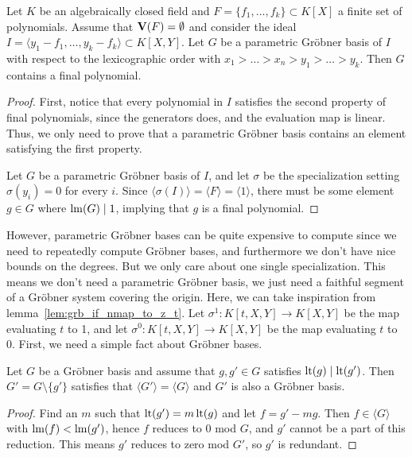 \begin{theorem}
  Let $K$ be an algebraically closed field and $F = \{f_{1}, \dots, f_{k}\} \subset K[X]$ a finite set of polynomials. Assume that $\operatorname{\mathbf V}(F) = \emptyset$ and consider the ideal $I = \langle y_{1} - f_{1}, \dots, y_{k} - f_{k} \rangle \subset K[X, Y]$. Let $G$ be a parametric Gröbner basis of $I$ with respect to the lexicographic order with $x_{1} > \dots > x_{n} > y_{1} > \dots > y_{k}$. Then $G$ contains a final polynomial.
\end{theorem}
\begin{proof}
  First, notice that every polynomial in $I$ satisfies the second property of final polynomials, since the generators does, and the evaluation map is linear. Thus, we only need to prove that a parametric Gröbner basis contains an element satisfying the first property.

  Let $G$ be a parametric Gröbner basis of $I$, and let $\sigma$ be the specialization setting $\sigma(y_{i}) = 0$ for every $i$. Since $\langle \sigma(I) \rangle = \langle F \rangle = \langle 1 \rangle$, there must be some element $g \in G$ where $\operatorname{lm}(G) \mid 1$, implying that $g$ is a final polynomial.
\end{proof}

However, parametric Gröbner bases can be quite expensive to compute since we need to repeatedly compute Gröbner bases, and furthermore we don't have nice bounds on the degrees. But we only care about one single specialization. This means we don't need a parametric Gröbner basis, we just need a faithful segment of a Gröbner system covering the origin. Here, we can take inspiration from lemma~\ref{lem:grb_if_nmap_to_z_t}. Let $\sigma^{1} : K[t, X, Y] \to K[X, Y]$ be the map evaluating $t$ to 1, and let $\sigma^{0} : K[t, X, Y] \to K[X, Y]$ be the map evaluating $t$ to 0. First, we need a simple fact about Gröbner bases.

\begin{lemma}\label{lem:redundant}
  Let $G$ be a Gröbner basis and assume that $g, g' \in G$ satisfies $\operatorname{lt}(g) \mid \operatorname{lt}(g')$. Then $G' = G \setminus \{g'\}$ satisfies that $\langle G' \rangle = \langle G \rangle$ and $G'$ is also a Gröbner basis.
\end{lemma}
\begin{proof}
  Find an $m$ such that $\operatorname{lt}(g') = m\operatorname{lt}(g)$ and let $f = g' - mg$. Then $f \in \langle G \rangle$ with $\operatorname{lm}(f) < \operatorname{lm}(g')$, hence $f$ reduces to 0 mod $G$, and $g'$ cannot be a part of this reduction. This means $g'$ reduces to zero mod $G'$, so $g'$ is redundant.
\end{proof}

